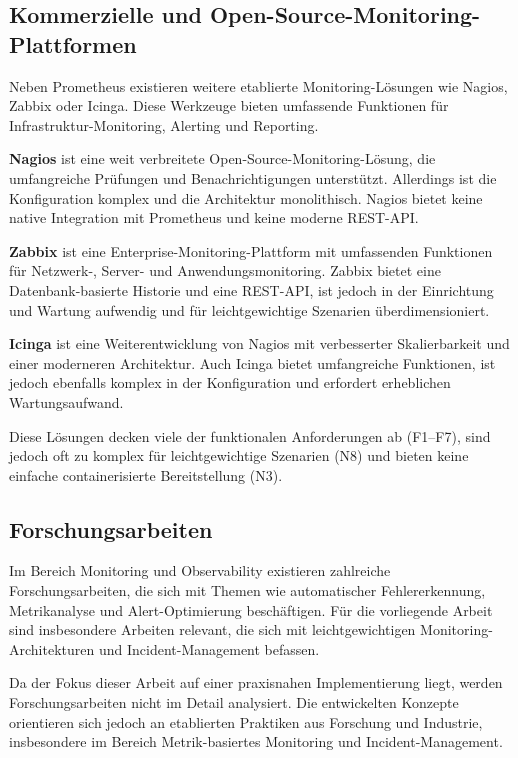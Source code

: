 \subsection{Kommerzielle und Open-Source-Monitoring-Plattformen}
\label{subsec:kommerzielle-loesungen}

Neben Prometheus existieren weitere etablierte Monitoring-Lösungen wie Nagios, Zabbix oder Icinga. Diese Werkzeuge bieten umfassende Funktionen für Infrastruktur-Monitoring, Alerting und Reporting.

\textbf{Nagios} ist eine weit verbreitete Open-Source-Monitoring-Lösung, die umfangreiche Prüfungen und Benachrichtigungen unterstützt. Allerdings ist die Konfiguration komplex und die Architektur monolithisch. Nagios bietet keine native Integration mit Prometheus und keine moderne REST-API.

\textbf{Zabbix} ist eine Enterprise-Monitoring-Plattform mit umfassenden Funktionen für Netzwerk-, Server- und Anwendungsmonitoring. Zabbix bietet eine Datenbank-basierte Historie und eine REST-API, ist jedoch in der Einrichtung und Wartung aufwendig und für leichtgewichtige Szenarien überdimensioniert.

\textbf{Icinga} ist eine Weiterentwicklung von Nagios mit verbesserter Skalierbarkeit und einer moderneren Architektur. Auch Icinga bietet umfangreiche Funktionen, ist jedoch ebenfalls komplex in der Konfiguration und erfordert erheblichen Wartungsaufwand.

Diese Lösungen decken viele der funktionalen Anforderungen ab (F1--F7), sind jedoch oft zu komplex für leichtgewichtige Szenarien (N8) und bieten keine einfache containerisierte Bereitstellung (N3).

\subsection{Forschungsarbeiten}
\label{subsec:forschungsarbeiten}

Im Bereich Monitoring und Observability existieren zahlreiche Forschungsarbeiten, die sich mit Themen wie automatischer Fehlererkennung, Metrikanalyse und Alert-Optimierung beschäftigen. Für die vorliegende Arbeit sind insbesondere Arbeiten relevant, die sich mit leichtgewichtigen Monitoring-Architekturen und Incident-Management befassen.

Da der Fokus dieser Arbeit auf einer praxisnahen Implementierung liegt, werden Forschungsarbeiten nicht im Detail analysiert. Die entwickelten Konzepte orientieren sich jedoch an etablierten Praktiken aus Forschung und Industrie, insbesondere im Bereich Metrik-basiertes Monitoring und Incident-Management.

